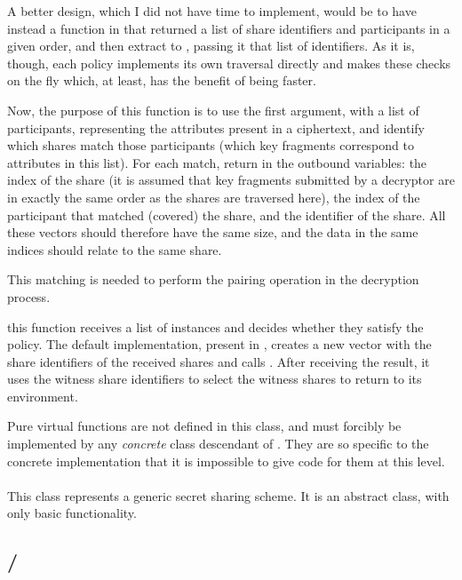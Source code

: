 \documentclass{article}
\begin{document}
\begin{description}
A better design, which I did not have time to implement, would be to have instead a function in \cAP that returned a list of share identifiers and participants in a given order, and then extract  to \cKPABE, passing it that list of identifiers. As it is, though, each policy implements its own traversal directly and makes these checks on the fly which, at least, has the benefit of being faster.

Now, the purpose of this function is to use the first argument, with a list of participants, representing the attributes present in a ciphertext, and identify which shares match those participants (which key fragments correspond to attributes in this list). For each match, return in the outbound variables: the index of the share (it is assumed that key fragments submitted by a decryptor are in exactly the same order as the shares are traversed here), the index of the participant that matched (covered) the share, and the identifier of the share. All these vectors should therefore have the same size, and the data in the same indices should relate to the same share. 

This matching is needed to perform the pairing operation in the decryption process.

\item[\code{evaluate()}] this function receives a list of \cST instances and decides whether they satisfy the policy. The default implementation, present in \fcss, creates a new vector with the share identifiers of the received shares and calls . After receiving the result, it uses the witness share identifiers to select the witness shares to return to its environment.

Pure virtual functions are not defined in this class, and must forcibly be implemented by any \emph{concrete} class descendant of \cAP. They are so specific to the concrete implementation that it is impossible to give code for them at this level.
\end{description}

\paragraph{\cSS}

This class represents a generic secret sharing scheme. It is an abstract class, with only basic functionality. 

\subsection{\fhkpabe / \fckpabe}
\end{document}
